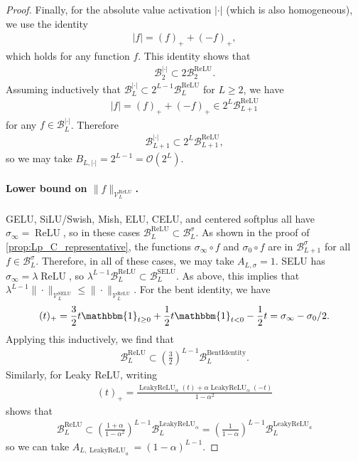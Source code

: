 \documentclass{article}
\DeclareMathOperator{\ReLU}{\mathrm{ReLU}}
\DeclareMathOperator{\LeakyReLU}{\mathrm{LeakyReLU}}
\DeclareMathOperator{\SELU}{\mathrm{SELU}}
\def\cB{{\mathcal{B}}}
\def\cO{{\mathcal{O}}}
\def\cV{{\mathcal{V}}}
\begin{document}
\begin{appendices}
\begin{proof}
    Finally, for the absolute value activation $|\cdot|$ (which is also homogeneous), we use the identity
    \begin{align}
        |f| = (f)_+ + (-f)_+,
    \end{align}
    which holds for any function $f$. This identity shows that
    \begin{align}
        \cB_2^{|\cdot|} \subset 2 \cB_2^{\ReLU}.
    \end{align}
    Assuming inductively that $\cB_L^{|\cdot|} \subset 2^{L-1} \cB_L^{\ReLU}$ for $L \geq 2$, we have
    \begin{align}
        |f| = (f)_+ + (-f)_+ \in 2^L \cB_{L+1}^{\ReLU}
    \end{align}
    for any $f \in \cB_L^{|\cdot|}$. Therefore
    \begin{align}
        \cB_{L+1}^{|\cdot|} \subset 2^L \cB_{L+1}^{\ReLU},
    \end{align}
    so we may take $B_{L,|\cdot|} = 2^{L-1} = \cO(2^L)$.
    
    
    
    \paragraph{Lower bound on $\| f \|_{\cV_L^{\ReLU}}$.} GELU, SiLU/Swish, Mish, ELU, CELU, and centered softplus all have $\sigma_\infty = \ReLU$, so in these cases $\cB_L^{\ReLU} \subset \cB_L^\sigma$. As shown in the proof of \cref{prop:Lp_C_representative}, the functions $\sigma_\infty \circ f$ and $\sigma_0 \circ f$ are in $\cB_{L+1}^{\sigma}$ for all $f \in \cB_L^\sigma$. Therefore, in all of these cases, we may take $A_{L,\sigma} = 1$. SELU has $\sigma_\infty = \lambda \ReLU$, so $\lambda^{L-1} \cB_L^{\ReLU} \subset \cB_L^{\SELU}$. As above, this implies that $\lambda^{L-1} \| \cdot \|_{\cV_L^{\SELU}} \leq \| \cdot \|_{\cV_L^{\ReLU}}$. For the bent identity, we have 
    \begin{align}
        (t)_+ = \frac{3}{2}t \mathbbm{1}_{t \geq 0} + \frac{1}{2} t \mathbbm{1}_{t < 0} - \frac{1}{2} t = \sigma_\infty - \sigma_0/2.
    \end{align}
    Applying this inductively, we find that
    \begin{align}
        \cB_L^{\ReLU} \subset \left( \frac{3}{2} \right)^{L-1} \cB_L^{\mathrm{BentIdentity}}.
    \end{align}
    Similarly, for Leaky ReLU, writing
    \begin{align}
        (t)_+ = \frac{\LeakyReLU_\alpha(t) + \alpha \LeakyReLU_\alpha(-t)}{1-\alpha^2}
    \end{align}
    shows that
    \begin{align}
        \cB_L^{\ReLU} \subset \left( \frac{1+\alpha}{1 - \alpha^2} \right)^{L-1} \cB_L^{\LeakyReLU_\alpha} = \left( \frac{1}{1 - \alpha} \right)^{L-1} \cB_L^{\LeakyReLU_a}
    \end{align}
    so we can take $A_{L,\LeakyReLU_a} = (1-\alpha)^{L-1}$.
    

\end{proof}
\end{appendices}
\end{document}
